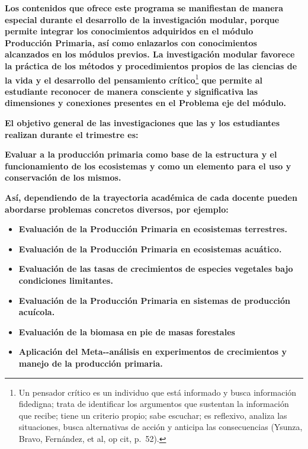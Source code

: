 \documentclass[
]{article}
\begin{document}
\textbf{Los contenidos que ofrece este programa se manifiestan de manera
especial durante el desarrollo de la investigación modular, porque
permite integrar los conocimientos adquiridos en el módulo Producción
Primaria, así como enlazarlos con conocimientos alcanzados en los
módulos previos. La investigación modular favorece la práctica de los
métodos y procedimientos propios de las ciencias de la vida y el
desarrollo del pensamiento crítico}\footnote{Un pensador crítico es un
  individuo que está informado y busca información fidedigna; trata de
  identificar los argumentos que sustentan la información que recibe;
  tiene un criterio propio; sabe escuchar; es reflexivo, analiza las
  situaciones, busca alternativas de acción y anticipa las consecuencias
  (Ysunza, Bravo, Fernández, et al, op cit, p.~52).} \textbf{que permite
al estudiante reconocer de manera consciente y significativa las
dimensiones y conexiones presentes en el Problema eje del módulo.}

\textbf{El objetivo general de las investigaciones que las y los
estudiantes realizan durante el trimestre es:}

\textbf{Evaluar a la producción primaria como base de la estructura y el
funcionamiento de los ecosistemas y como un elemento para el uso y
conservación de los mismos.}

\textbf{Así, dependiendo de la trayectoria académica de cada docente
pueden abordarse problemas concretos diversos, por ejemplo:}

\begin{itemize}
\item
  \textbf{Evaluación de la Producción Primaria en ecosistemas
  terrestres.}
\item
  \textbf{Evaluación de la Producción Primaria en ecosistemas acuático.}
\item
  \textbf{Evaluación de las tasas de crecimientos de especies vegetales
  bajo condiciones limitantes.}
\item
  \textbf{Evaluación de la Producción Primaria en sistemas de producción
  acuícola.}
\item
  \textbf{Evaluación de la biomasa en pie de masas forestales}
\item
  \textbf{Aplicación del Meta-\/-análisis en experimentos de
  crecimientos y manejo de la producción primaria.}
\end{itemize}
\end{document}
